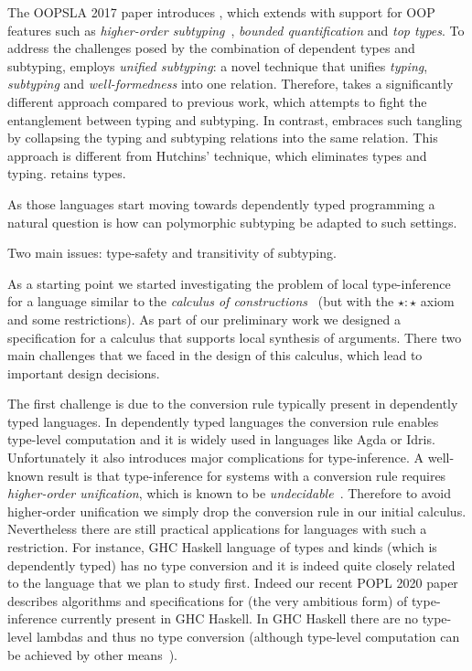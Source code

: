 The OOPSLA 2017 paper introduces \name, which extends
\lami with support for OOP features such as
\emph{higher-order subtyping}~\cite{fsubo}, \emph{bounded quantification} and
\emph{top types}.
To address the challenges posed by
the combination of dependent types and subtyping, \name
employs \emph{unified subtyping}: a novel technique that unifies
\emph{typing}, \emph{subtyping} and \emph{well-formedness} into one
relation. Therefore, \name takes a significantly different
approach compared to previous work, which
attempts to fight the entanglement between typing and subtyping. In
contrast, \name embraces such
tangling by collapsing the typing and subtyping
relations into the same relation.  This approach is different from
Hutchins' technique, which eliminates types and typing. \name
retains types.

As those languages start moving towards dependently typed
programming a natural question is how can polymorphic subtyping be
adapted to such settings.

Two main issues: type-safety and transitivity of subtyping.


As a starting point we started investigating the problem of local
type-inference for a language similar to the \emph{calculus of
  constructions}~\cite{Coquand:Huet} (but with the $\star : \star$ axiom and
some restrictions). As part of our preliminary work we designed a
specification for a calculus that supports local synthesis of arguments.
There two main challenges that we faced in the design of this calculus,
which lead to important design decisions.

The first challenge is due to the conversion rule typically present in
dependently typed languages. %
In dependently typed languages the conversion rule enables type-level
computation and it is widely used in languages like Agda or
Idris. Unfortunately it also introduces major complications for
type-inference. A well-known result is that type-inference for systems
with a conversion rule requires \emph{higher-order
  unification}, which is known to be \emph{undecidable}~\cite{goldfarb1981undecidability}.
Therefore to avoid higher-order unification we simply drop
the conversion rule in our initial calculus.
Nevertheless there are still practical applications for languages
with such a restriction. For instance, GHC Haskell language of types and kinds
(which is dependently typed) has no type conversion and it is indeed quite
closely related to the language that we plan to study first. Indeed
our recent POPL 2020 paper~\cite{xie20kind} describes algorithms and specifications
for (the very ambitious form) of type-inference currently present in GHC Haskell.
In GHC Haskell there are no type-level lambdas and thus no type conversion
(although type-level computation can be achieved by other means~\cite{Chakravarty05associated}).

